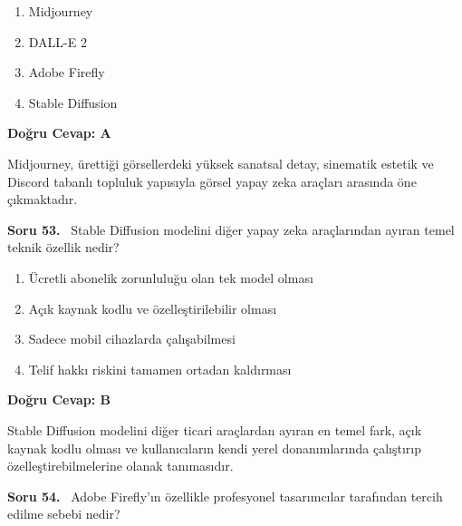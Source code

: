 \documentclass[11pt,a4paper,openany]{book}
\begin{document}
\begin{enumerate}[label=\Alph*), leftmargin=25pt, topsep=4pt, itemsep=2pt]
        \item Midjourney
        \item DALL-E 2
        \item Adobe Firefly
        \item Stable Diffusion
\end{enumerate}

\vspace{4pt}
\begin{tcolorbox}[title=Cevap ve Açıklama, colback=gray!3!white, colframe=primarycolor!90!black, arc=2mm, fonttitle=\bfseries\sffamily, top=6pt, bottom=6pt]
    \textbf{Doğru Cevap: A}

    \vspace{2pt}
    Midjourney, ürettiği görsellerdeki yüksek sanatsal detay, sinematik estetik ve Discord tabanlı topluluk yapısıyla görsel yapay zeka araçları arasında öne çıkmaktadır.
\end{tcolorbox}
\vspace{10pt}
\needspace{5cm}
\vspace{8pt}
\noindent\textbf{\large\sffamily Soru 53.} \ Stable Diffusion modelini diğer yapay zeka araçlarından ayıran temel teknik özellik nedir?

\begin{enumerate}[label=\Alph*), leftmargin=25pt, topsep=4pt, itemsep=2pt]
        \item Ücretli abonelik zorunluluğu olan tek model olması
        \item Açık kaynak kodlu ve özelleştirilebilir olması
        \item Sadece mobil cihazlarda çalışabilmesi
        \item Telif hakkı riskini tamamen ortadan kaldırması
\end{enumerate}

\vspace{4pt}
\begin{tcolorbox}[title=Cevap ve Açıklama, colback=gray!3!white, colframe=primarycolor!90!black, arc=2mm, fonttitle=\bfseries\sffamily, top=6pt, bottom=6pt]
    \textbf{Doğru Cevap: B}

    \vspace{2pt}
    Stable Diffusion modelini diğer ticari araçlardan ayıran en temel fark, açık kaynak kodlu olması ve kullanıcıların kendi yerel donanımlarında çalıştırıp özelleştirebilmelerine olanak tanımasıdır.
\end{tcolorbox}
\vspace{10pt}
\needspace{5cm}
\vspace{8pt}
\noindent\textbf{\large\sffamily Soru 54.} \ Adobe Firefly'ın özellikle profesyonel tasarımcılar tarafından tercih edilme sebebi nedir?
\end{document}
